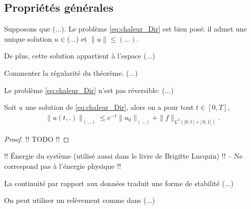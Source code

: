 \documentclass[12pt,a4paper,twoside]{article}
\begin{document}
\subsection{Propri\'et\'es g\'en\'erales}



\begin{theorem}
  \label{thm:chaleur_existence}
  Supposons que (...).
  Le probl\`eme \eqref{eq:chaleur_Dir} est bien pos\'e:
  il admet une unique solution $u \in $(...)
  et $\| u \| \leq (...)$.

  De plus, cette solution appartient \`a l'espace (...)
\end{theorem}

\begin{remark}
  Commenter la r\'egularit\'e du th\'eor\`eme. (...)
\end{remark}

\begin{proposition}
  Le probl\`eme \eqref{eq:chaleur_Dir} n'est pas r\'eversible:
  (...)
\end{proposition}


\begin{proposition}
  \label{prop:chaleur_continuite_donnees}
  Soit $u$ une solution de \eqref{eq:chaleur_Dir},
  alors on a pour tout $t \in [0,T]$,
  \begin{align*}
    \| u(t,.) \|_{(...)} \leq e^{-t} \| u_0 \|_{(...)} + \| f \|_{L^2(]0,t[ \times ]0,1[)} .
  \end{align*}
\end{proposition}

\begin{proof}
  !! TODO !!
\end{proof}


\begin{remark}
  !! \'Energie du syst\`eme (utilis\'e aussi dans le livre de Brigitte Lucquin) !!
  -- Ne correspond pas \`a l'\'energie physique !!
\end{remark}

\begin{remark}
  La continuit\'e par rapport aux donn\'ees traduit une forme de stabilit\'e
  (...)
\end{remark}

\begin{remark}
  On peut utiliser un rel\`evement comme dans (...)
\end{remark}
\end{document}
